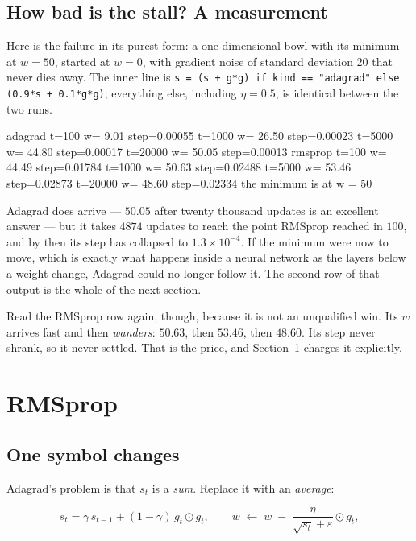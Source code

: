 \documentclass[11pt]{article}
\begin{document}
\subsection{How bad is the stall? A measurement}

Here is the failure in its purest form: a one-dimensional bowl with its minimum
at $w = 50$, started at $w = 0$, with gradient noise of standard deviation $20$
that never dies away. The inner line is \texttt{s = (s + g*g) if kind ==
"adagrad" else (0.9*s + 0.1*g*g)}; everything else, including $\eta = 0.5$, is
identical between the two runs.
\begin{codeout}
adagrad  t=100   w=  9.01 step=0.00055  t=1000  w= 26.50 step=0.00023
         t=5000  w= 44.80 step=0.00017  t=20000 w= 50.05 step=0.00013
rmsprop  t=100   w= 44.49 step=0.01784  t=1000  w= 50.63 step=0.02488
         t=5000  w= 53.46 step=0.02873  t=20000 w= 48.60 step=0.02334
the minimum is at w = 50
\end{codeout}

Adagrad does arrive --- $50.05$ after twenty thousand updates is an excellent
answer --- but it takes $4874$ updates to reach the point RMSprop reached in
$100$, and by then its step has collapsed to $1.3\times10^{-4}$. If the minimum
were now to move, which is exactly what happens inside a neural network as the
layers below a weight change, Adagrad could no longer follow it. The second row
of that output is the whole of the next section.

Read the RMSprop row again, though, because it is not an unqualified win. Its
$w$ arrives fast and then \emph{wanders}: $50.63$, then $53.46$, then $48.60$.
Its step never shrank, so it never settled. That is the price, and
Section~\ref{sec:rmsprop} charges it explicitly.

\section{RMSprop}
\label{sec:rmsprop}

\subsection{One symbol changes}

Adagrad's problem is that $s_t$ is a \emph{sum}. Replace it with an
\emph{average}:

\begin{equation}
  \label{eq:rmsprop}
  s_t = \gamma\, s_{t-1} + (1-\gamma)\, g_t \odot g_t,
  \qquad
  w \;\leftarrow\; w \;-\; \frac{\eta}{\sqrt{s_t} + \varepsilon} \odot g_t ,
\end{equation}
\end{document}
